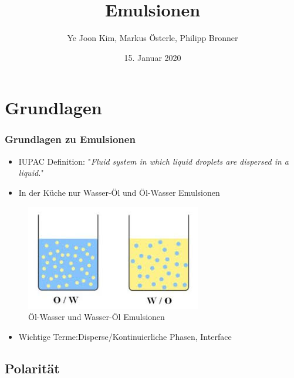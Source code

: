 \documentclass{beamer} %
\title[Emulsionen ]{Emulsionen}
\subtitle[Seminar Physik in der Küche]{}
\date[15. Januar 2020]{15. Januar 2020}
\author[Markus, Phillip und Kim]{Ye Joon Kim, Markus \"Osterle, Philipp Bronner}
\begin{document}
\begin{frame}
\titlepage
\end{frame}

\section{Grundlagen}

\begin{frame}
\frametitle{Grundlagen zu Emulsionen}
\begin{itemize}
	\item IUPAC Definition: "\textit{Fluid system in which liquid droplets are dispersed in a liquid.}"\pause
	\item In der Küche nur Wasser-Öl und Öl-Wasser Emulsionen
\end{itemize}
	\begin{figure}
		\centering
		\includegraphics[width=0.5\linewidth]{owwo.jpg}
		\caption{Öl-Wasser und Wasser-Öl Emulsionen}
	\end{figure}
\begin{itemize}
	\item{Wichtige Terme:Disperse/Kontinuierliche Phasen, Interface}
\end{itemize}
\end{frame}

\subsection{Polarität}
\end{document}
